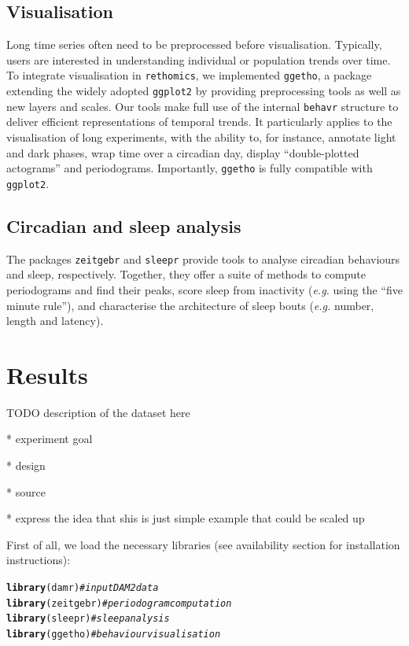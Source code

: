 \documentclass[10pt,letterpaper]{article}\usepackage[]{graphicx}\usepackage[]{color}
\makeatletter
\newcommand{\hlcom}[1]{\textcolor[rgb]{0.678,0.584,0.686}{\textit{#1}}}%
\newcommand{\hlstd}[1]{\textcolor[rgb]{0.345,0.345,0.345}{#1}}%
\newcommand{\hlkwd}[1]{\textcolor[rgb]{0.737,0.353,0.396}{\textbf{#1}}}%
\newenvironment{kframe}{%
 \def\at@end@of@kframe{}%
 \ifinner\ifhmode%
  \def\at@end@of@kframe{\end{minipage}}%
  \begin{minipage}{\columnwidth}%
 \fi\fi%
 \def\FrameCommand##1{\hskip\@totalleftmargin \hskip-\fboxsep
 \colorbox{shadecolor}{##1}\hskip-\fboxsep
     \hskip-\linewidth \hskip-\@totalleftmargin \hskip\columnwidth}%
 \MakeFramed {\advance\hsize-\width
   \@totalleftmargin\z@ \linewidth\hsize
   \@setminipage}}%
 {\par\unskip\endMakeFramed%
 \at@end@of@kframe}
\newenvironment{knitrout}{}{} %
\makeatother
\begin{document}
\subsection*{Visualisation}
Long time series often need to be preprocessed before visualisation.
Typically, users are interested in understanding individual or population trends over time.
To integrate visualisation in \texttt{rethomics},
we implemented \texttt{ggetho}, a package extending the widely adopted \texttt{ggplot2}\cite{wickham_ggplot2:_2016} by providing preprocessing tools as well as new layers and scales.
Our tools make full use of the internal \texttt{behavr} structure to deliver efficient representations of temporal trends.
It particularly applies to the visualisation of long experiments, with the ability to, for instance, annotate light and dark phases, wrap time over a circadian day, display ``double-plotted actograms'' and periodograms. 
Importantly, \texttt{ggetho} is fully compatible with \texttt{ggplot2}.

\subsection*{Circadian and sleep analysis}
The packages \texttt{zeitgebr} and \texttt{sleepr} provide tools to analyse circadian behaviours and sleep, respectively.
Together, they offer a suite of methods to compute periodograms and find their peaks, score sleep from inactivity (\emph{e.g.} using the ``five minute rule''), and characterise the architecture of sleep bouts (\emph{e.g.} number, length and latency).







\section*{Results}

TODO description of the dataset here

* experiment goal

* design

* source

* express the idea that shis is just simple example that could be scaled up



First of all, we load the necessary libraries (see availability section for installation instructions):
\begin{knitrout}
\color{fgcolor}\begin{kframe}
\begin{alltt}
\hlkwd{library}\hlstd{(damr)}      \hlcom{# input DAM2 data}
\hlkwd{library}\hlstd{(zeitgebr)}  \hlcom{# periodogram computation}
\hlkwd{library}\hlstd{(sleepr)}    \hlcom{# sleep analysis}
\hlkwd{library}\hlstd{(ggetho)}    \hlcom{# behaviour visualisation}
\end{alltt}
\end{kframe}
\end{knitrout}
\end{document}
